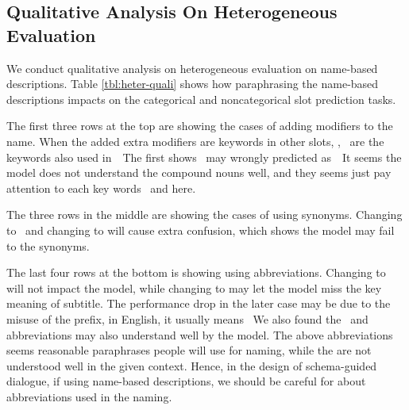 \subsection[Qualitative Analysis On Heterogeneous
Evaluation]{Qualitative Analysis On Heterogeneous \\Evaluation}
\label{ssec:qualitative-analysis}
We conduct qualitative analysis on heterogeneous evaluation on
name-based descriptions. Table \ref{tbl:heter-quali} shows how
paraphrasing the name-based descriptions impacts on the categorical and
noncategorical slot prediction tasks.

The first three rows at the top are showing the cases of adding modifiers
to the name. When the added extra modifiers are keywords in other
slots, \eg,~ are the keywords also used
in~~The first
shows~ may wrongly predicted
as~~It seems the model does not understand
the compound nouns well, and they seems just pay attention to each key
words~ and  here.

The three rows in the middle are showing the cases of using
synonyms. Changing  to ~and changing  to  will
cause extra confusion, which shows the model may fail to the synonyms.

The last four rows at the bottom is showing using abbreviations. Changing
 to  will not impact the model, while
changing  to  may let the model miss
the key meaning of subtitle.  The performance drop in the later case
may be due to the misuse of the  prefix, in English, it
usually means ~We also
found the~ and~ abbreviations may also understand well by
the model. The above abbreviations seems reasonable paraphrases people
will use for naming, while the are not understood well in the given
context. Hence, in the design of schema-guided dialogue, if using
name-based descriptions, we should be careful for about abbreviations
used in the naming.

